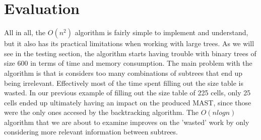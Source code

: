 \section{Evaluation}
All in all, the $O(n^2)$ algorithm is fairly simple to implement and understand, but it also has its practical limitations when working with large trees. As we will see in the testing section, the algorithm starts having trouble with binary trees of size 600 in terms of time and memory consumption. The main problem with the algorithm is that is considers too many combinations of subtrees that end up being irrelevant. Effectively most of the time spent filling out the size table is wasted. In our previous example of filling out the size table of 225 cells, only 25 cells ended up ultimately having an impact on the produced MAST, since those were the only ones accesed by the backtracking algorithm. The $O(nlogn)$ algorithm that we are about to examine improves on the 'wasted' work by only considering more relevant information between subtrees.